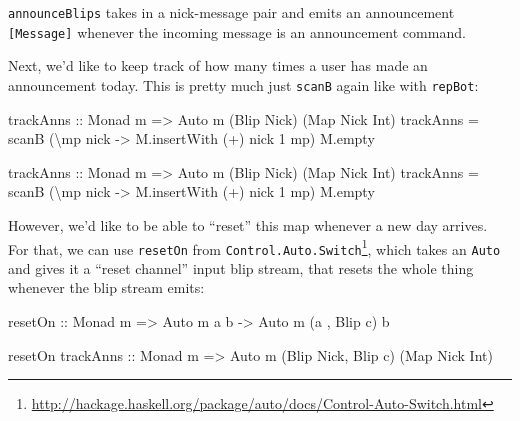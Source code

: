 \documentclass[]{article}
\newenvironment{Shaded}{}{}
\newcommand{\DataTypeTok}[1]{\textcolor[rgb]{0.56,0.13,0.00}{{#1}}}
\newcommand{\DecValTok}[1]{\textcolor[rgb]{0.25,0.63,0.44}{{#1}}}
\newcommand{\OtherTok}[1]{\textcolor[rgb]{0.00,0.44,0.13}{{#1}}}
\newcommand{\FunctionTok}[1]{\textcolor[rgb]{0.02,0.16,0.49}{{#1}}}
\newcommand{\NormalTok}[1]{{#1}}
\renewcommand{\href}[2]{#2\footnote{\url{#1}}}
\begin{document}
\texttt{announceBlips} takes in a nick-message pair and emits an
announcement \texttt{{[}Message{]}} whenever the incoming message is an
announcement command.

Next, we'd like to keep track of how many times a user has made an
announcement today. This is pretty much just \texttt{scanB} again like
with \texttt{repBot}:

\begin{Shaded}
\begin{Highlighting}[]
\OtherTok{    trackAnns ::} \DataTypeTok{Monad} \NormalTok{m }\OtherTok{=>} \DataTypeTok{Auto} \NormalTok{m (}\DataTypeTok{Blip} \DataTypeTok{Nick}\NormalTok{) (}\DataTypeTok{Map} \DataTypeTok{Nick} \DataTypeTok{Int}\NormalTok{)}
    \NormalTok{trackAnns }\FunctionTok{=} \NormalTok{scanB (\textbackslash{}mp nick }\OtherTok{->} \NormalTok{M.insertWith (}\FunctionTok{+}\NormalTok{) nick }\DecValTok{1} \NormalTok{mp) M.empty}



\OtherTok{trackAnns ::} \DataTypeTok{Monad} \NormalTok{m }\OtherTok{=>} \DataTypeTok{Auto} \NormalTok{m (}\DataTypeTok{Blip} \DataTypeTok{Nick}\NormalTok{) (}\DataTypeTok{Map} \DataTypeTok{Nick} \DataTypeTok{Int}\NormalTok{)}
\NormalTok{trackAnns }\FunctionTok{=} \NormalTok{scanB (\textbackslash{}mp nick }\OtherTok{->} \NormalTok{M.insertWith (}\FunctionTok{+}\NormalTok{) nick }\DecValTok{1} \NormalTok{mp) M.empty}
\end{Highlighting}
\end{Shaded}

However, we'd like to be able to ``reset'' this map whenever a new day
arrives. For that, we can use \texttt{resetOn} from
\href{http://hackage.haskell.org/package/auto/docs/Control-Auto-Switch.html}{\texttt{Control.Auto.Switch}},
which takes an \texttt{Auto} and gives it a ``reset channel'' input blip
stream, that resets the whole thing whenever the blip stream emits:

\begin{Shaded}
\begin{Highlighting}[]
\OtherTok{resetOn ::} \DataTypeTok{Monad} \NormalTok{m }\OtherTok{=>} \DataTypeTok{Auto} \NormalTok{m a b }\OtherTok{->} \DataTypeTok{Auto} \NormalTok{m (a        , }\DataTypeTok{Blip} \NormalTok{c) b}

\NormalTok{resetOn}\OtherTok{ trackAnns ::} \DataTypeTok{Monad} \NormalTok{m }\OtherTok{=>}     \DataTypeTok{Auto} \NormalTok{m (}\DataTypeTok{Blip} \DataTypeTok{Nick}\NormalTok{, }\DataTypeTok{Blip} \NormalTok{c) (}\DataTypeTok{Map} \DataTypeTok{Nick} \DataTypeTok{Int}\NormalTok{)}
\end{Highlighting}
\end{Shaded}
\end{document}
